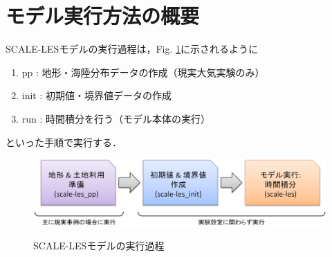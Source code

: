 \section{モデル実行方法の概要}

SCALE-LESモデルの実行過程は，Fig. \ref{fig:howto}に示されるように
\begin{enumerate}
\item pp : 地形・海陸分布データの作成（現実大気実験のみ）
\item init : 初期値・境界値データの作成
\item run : 時間積分を行う（モデル本体の実行）
\end{enumerate}
といった手順で実行する．


\begin{figure}[h]
\begin{center}
  \includegraphics[width=0.9\hsize]{./figure/how_to_run.eps}\\
  \caption{SCALE-LESモデルの実行過程}
  \label{fig:howto}
\end{center}
\end{figure}


